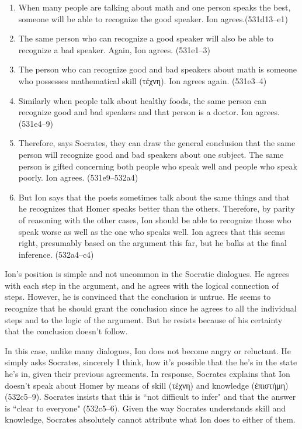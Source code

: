 \documentclass[12pt,letterpaper]{article}
\begin{document}
\begin{enumerate}

    \item When many people are talking about math and one person speaks the best, someone will be able to recognize the good speaker. Ion agrees.(531d13--e1)

    \item The same person who can recognize a good speaker will also be able to recognize a bad speaker. Again, Ion agrees. (531e1--3)

    \item The person who can recognize good and bad speakers about math is someone who possesses mathematical skill (\textgreek{τέχνη}). Ion agrees again. (531e3--4)

    \item Similarly when people talk about healthy foods, the same person can recognize good and bad speakers and that person is a doctor. Ion agrees. (531e4--9)

    \item Therefore, says Socrates, they can draw the general conclusion that the same person will recognize good and bad speakers about one subject. The same person is gifted concerning both people who speak well and people who speak poorly. Ion agrees. (531e9--532a4)

    \item But Ion says that the poets sometimes talk about the same things and that he recognizes that Homer speaks better than the others. Therefore, by parity of reasoning with the other cases, Ion should be able to recognize those who speak worse as well as the one who speaks well. Ion agrees that this seems right, presumably based on the argument this far, but he balks at the final inference. (532a4--c4)

\end{enumerate}

Ion's position is simple and not uncommon in the Socratic dialogues. He agrees with each step in the argument, and he agrees with the logical connection of steps. However, he is convinced that the conclusion is untrue. He seems to recognize that he should grant the conclusion since he agrees to all the individual steps and to the logic of the argument. But he resists because of his certainty that the conclusion doesn't follow.

In this case, unlike many dialogues, Ion does not become angry or reluctant. He simply asks Socrates, sincerely I think, how it's possible that the he's in the state he's in, given their previous agreements. In response, Socrates explains that Ion doesn't speak about Homer by means of skill (\textgreek{τέχνη}) and knowledge (\textgreek{ἐπιστήμη}) (532c5--9). Socrates insists that this is ``not difficult to infer" and that the answer is ``clear to everyone" (532c5--6). Given the way Socrates understands skill and knowledge, Socrates absolutely cannot attribute what Ion does to either of them.
\end{document}
